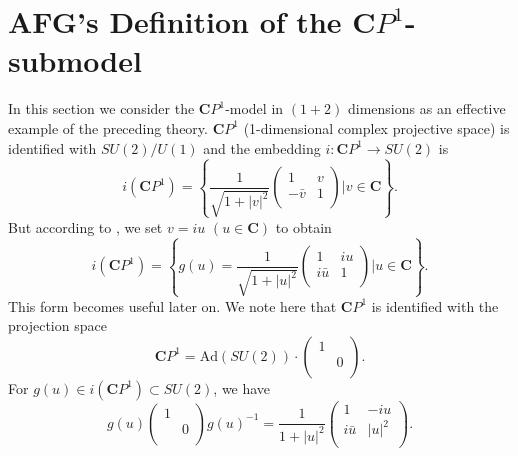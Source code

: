 \documentclass[makeidx,12pt,openany]{report}
\begin{document}
 \section{AFG's Definition of the $\mathbf{C}P^1$-submodel}\label{section:2}
In this section we consider the $\mathbf{C}P^1$-model in $(1+2)$ dimensions 
as an effective example of the preceding theory. $\mathbf{C}P^1$ 
(1-dimensional complex projective space) is identified with $SU(2)/U(1)$ 
and the embedding $i:\mathbf{C}P^1 \rightarrow SU(2)$ is 
\begin{equation}
 i(\mathbf{C}P^1)=\left\{
          \frac{1}{\sqrt{1+|v|^2}}
           \left(
            \begin{array}{cc}
               1     & v \\
            -\bar{v} & 1 \\
            \end{array}
           \right)
          |v \in \mathbf{C}
         \right\} .
\end{equation}
But according to \cite{AFG1}, we set $v=iu$ $(u \in \mathbf{C})$ to obtain 
\begin{equation}
 i(\mathbf{C}P^1)=\left\{ g(u)=
          \frac{1}{\sqrt{1+|u|^2}}
           \left(
            \begin{array}{cc}
               1     & iu \\
            i\bar{u} & 1 \\
            \end{array}
           \right)
          |u \in \mathbf{C}
         \right\} .
 \label{eqn:25}
\end{equation}
This form becomes useful later on. We note here that $\mathbf{C}P^1$ is 
identified with the projection space
\begin{equation}
 \mathbf{C}P^1=\mbox{Ad}(SU(2)) \cdot 
           \left(
            \begin{array}{cc}
               1 &   \\
                 & 0 \\
            \end{array}
           \right). 
\end{equation}
For $g(u) \in i(\mathbf{C}P^1) \subset SU(2)$, we have 
\begin{equation}
g(u) \left(
            \begin{array}{cc}
               1 &   \\
                 & 0 \\
            \end{array}
           \right) g(u)^{-1}
=\frac{1}{1+|u|^2}
           \left(
            \begin{array}{cc}
               1     & -iu   \\
            i\bar{u} & |u|^2 \\
            \end{array}
           \right) .
\end{equation}
\end{document}

